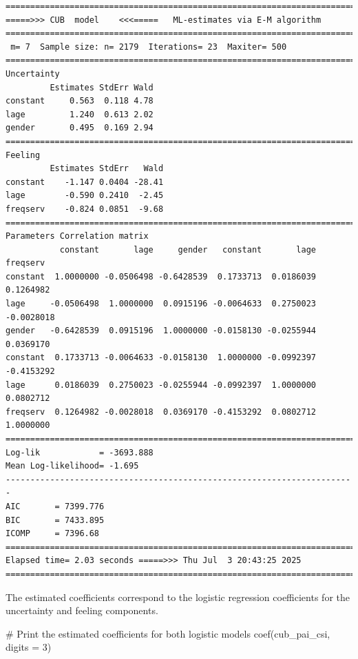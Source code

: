 \documentclass[
  letterpaper,
  DIV=11,
  numbers=noendperiod]{scrartcl}
\newenvironment{Shaded}{\begin{snugshade}}{\end{snugshade}}
\newcommand{\AttributeTok}[1]{\textcolor[rgb]{0.40,0.45,0.13}{#1}}
\newcommand{\CommentTok}[1]{\textcolor[rgb]{0.37,0.37,0.37}{#1}}
\newcommand{\DecValTok}[1]{\textcolor[rgb]{0.68,0.00,0.00}{#1}}
\newcommand{\FunctionTok}[1]{\textcolor[rgb]{0.28,0.35,0.67}{#1}}
\newcommand{\NormalTok}[1]{\textcolor[rgb]{0.00,0.23,0.31}{#1}}
\begin{document}
\begin{verbatim}
======================================================================= 
=====>>> CUB  model    <<<=====   ML-estimates via E-M algorithm   
======================================================================= 
 m= 7  Sample size: n= 2179  Iterations= 23  Maxiter= 500 
======================================================================= 
Uncertainty                                            
         Estimates StdErr Wald
constant     0.563  0.118 4.78
lage         1.240  0.613 2.02
gender       0.495  0.169 2.94
======================================================================= 
Feeling                                            
         Estimates StdErr   Wald
constant    -1.147 0.0404 -28.41
lage        -0.590 0.2410  -2.45
freqserv    -0.824 0.0851  -9.68
======================================================================= 
Parameters Correlation matrix 
           constant       lage     gender   constant       lage   freqserv
constant  1.0000000 -0.0506498 -0.6428539  0.1733713  0.0186039  0.1264982
lage     -0.0506498  1.0000000  0.0915196 -0.0064633  0.2750023 -0.0028018
gender   -0.6428539  0.0915196  1.0000000 -0.0158130 -0.0255944  0.0369170
constant  0.1733713 -0.0064633 -0.0158130  1.0000000 -0.0992397 -0.4153292
lage      0.0186039  0.2750023 -0.0255944 -0.0992397  1.0000000  0.0802712
freqserv  0.1264982 -0.0028018  0.0369170 -0.4153292  0.0802712  1.0000000
======================================================================= 
Log-lik            = -3693.888 
Mean Log-likelihood= -1.695 
----------------------------------------------------------------------- 
AIC       = 7399.776 
BIC       = 7433.895 
ICOMP     = 7396.68 
======================================================================= 
Elapsed time= 2.03 seconds =====>>> Thu Jul  3 20:43:25 2025 
======================================================================= 
\end{verbatim}

The estimated coefficients correspond to the logistic regression
coefficients for the uncertainty and feeling components.

\begin{Shaded}
\begin{Highlighting}[]
\CommentTok{\# Print the estimated coefficients for both logistic models}
\FunctionTok{coef}\NormalTok{(cub\_pai\_csi, }\AttributeTok{digits =} \DecValTok{3}\NormalTok{)}
\end{Highlighting}
\end{Shaded}
\end{document}
